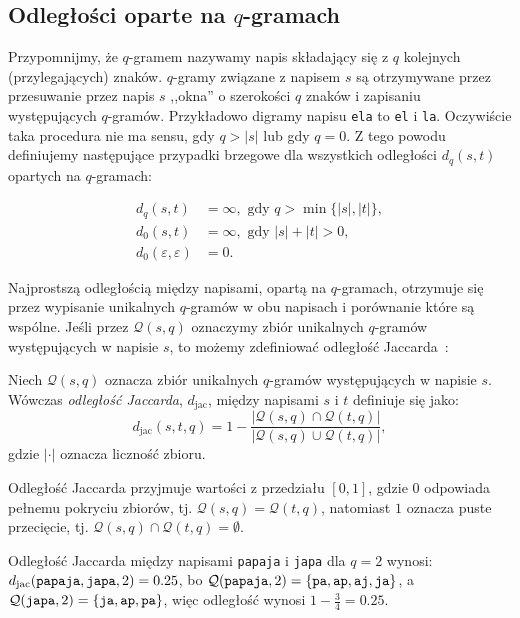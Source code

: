 \documentclass{praca1}
\begin{document}
\subsection{Odległości oparte na $q$-gramach}

Przypomnijmy, że $q$-gramem nazywamy napis składający się z $q$ kolejnych (przylegających) znaków. $q$-gramy związane z napisem $s$ są otrzymywane przez przesuwanie przez napis $s$ ,,okna'' o szerokości $q$ znaków i zapisaniu występujących $q$-gramów. Przykładowo digramy napisu \verb|ela| to \verb|el| i \verb|la|. Oczywiście taka procedura nie ma sensu, gdy $q > |s|$ lub gdy $q = 0$. Z tego powodu definiujemy następujące przypadki brzegowe dla wszystkich odległości $d_q(s,t)$ opartych na $q$-gramach:

\begin{align*}
d_q(s,t) &= \infty, \text{ gdy } q > \min\{|s|, |t|\},\\
d_0(s,t) &= \infty, \text{ gdy } |s| + |t| > 0, \\
d_0(\varepsilon,\varepsilon) &= 0.
\end{align*}

Najprostszą odległością między napisami, opartą na $q$-gramach, otrzymuje się przez wypisanie unikalnych $q$-gramów w obu napisach i porównanie które są wspólne. Jeśli przez $\mathcal{Q}(s,q)$ oznaczymy zbiór unikalnych $q$-gramów występujących w napisie $s$, to możemy zdefiniować odległość Jaccarda~\cite{Loo2014:stringdist}:

\begin{definition}
Niech $\mathcal{Q}(s,q)$ oznacza zbiór unikalnych $q$-gramów występujących w napisie $s$. Wówczas \emph{odległość Jaccarda}, $d_{\mathrm{jac}}$, między napisami $s$ i $t$ definiuje się jako:
\begin{equation*}
d_{\mathrm{jac}}(s,t,q) = 1 - \frac{|\mathcal{Q}(s,q) \cap \mathcal{Q}(t,q)|}{|\mathcal{Q}(s,q) \cup \mathcal{Q}(t,q)|},
\end{equation*}
gdzie $|\cdot|$ oznacza liczność zbioru.
\end{definition} 

Odległość Jaccarda przyjmuje wartości z przedziału $[0,1]$, gdzie $0$ odpowiada pełnemu pokryciu zbiorów, tj. $\mathcal{Q}(s,q) = \mathcal{Q}(t,q)$, natomiast $1$ oznacza puste przecięcie, tj. \hbox{$\mathcal{Q}(s,q) \cap \mathcal{Q}(t,q) = \emptyset$.}

\begin{example}
Odległość Jaccarda między napisami \verb|papaja| i \verb|japa| dla $q = 2$ wynosi: $d_{\mathrm{jac}}(\verb|papaja|, \verb|japa|, 2)  = 0.25$, bo $\mathcal{Q}(\verb|papaja|, 2) = \{\verb|pa|, \verb|ap|, \verb|aj|, \verb|ja|\}$, a $\mathcal{Q}(\verb|japa|, 2) = \{\verb|ja|, \verb|ap|, \verb|pa|\}$, więc odległość wynosi $1 - \frac{3}{4} = 0.25$.
\end{example}
\end{document}

